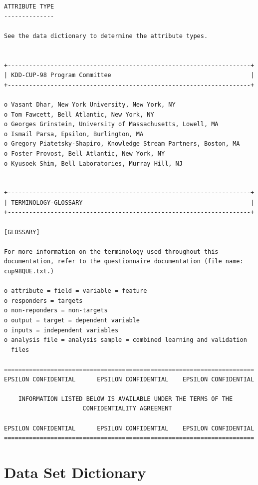 \documentclass[
  11pt,
  a4paper,
  DIV=12,captions=tableheading,oneside,titlepage]{scrbook}
\begin{document}
\begin{verbatim}
ATTRIBUTE TYPE
--------------

See the data dictionary to determine the attribute types. 


+--------------------------------------------------------------------+
| KDD-CUP-98 Program Committee                                       |
+--------------------------------------------------------------------+

o Vasant Dhar, New York University, New York, NY
o Tom Fawcett, Bell Atlantic, New York, NY
o Georges Grinstein, University of Massachusetts, Lowell, MA
o Ismail Parsa, Epsilon, Burlington, MA
o Gregory Piatetsky-Shapiro, Knowledge Stream Partners, Boston, MA
o Foster Provost, Bell Atlantic, New York, NY
o Kyusoek Shim, Bell Laboratories, Murray Hill, NJ


+--------------------------------------------------------------------+
| TERMINOLOGY-GLOSSARY                                               |
+--------------------------------------------------------------------+

[GLOSSARY]

For more information on the terminology used throughout this
documentation, refer to the questionnaire documentation (file name:
cup98QUE.txt.)

o attribute = field = variable = feature
o responders = targets
o non-reponders = non-targets 
o output = target = dependent variable
o inputs = independent variables
o analysis file = analysis sample = combined learning and validation 
  files 

======================================================================
EPSILON CONFIDENTIAL      EPSILON CONFIDENTIAL    EPSILON CONFIDENTIAL

    INFORMATION LISTED BELOW IS AVAILABLE UNDER THE TERMS OF THE  
                      CONFIDENTIALITY AGREEMENT                

EPSILON CONFIDENTIAL      EPSILON CONFIDENTIAL    EPSILON CONFIDENTIAL
======================================================================

\end{verbatim}

\hypertarget{data-set-dictionary}{%
\section{Data Set Dictionary}\label{data-set-dictionary}}
\end{document}
